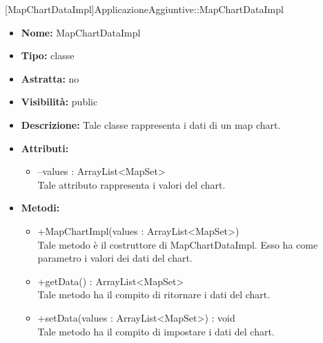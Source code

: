 			[MapChartDataImpl]{ApplicazioneAggiuntive::MapChartDataImpl}
			

	
			
			\begin{itemize}
			\item \textbf{Nome:} MapChartDataImpl
			\item \textbf{Tipo:} classe
			
		\item \textbf{Astratta:}
		no
			\item \textbf{Visibilità:} public
			\item \textbf{Descrizione:} Tale classe rappresenta i dati di un map chart.
			\item \textbf{Attributi:}
				\begin{itemize}
				\setlength{\itemsep}{5pt}
				
					\item[\ding{111}] {--values : ArrayList<MapSet>} \\ [1mm] Tale attributo rappresenta i valori del chart.
				\end{itemize}
		
			\item \textbf{Metodi:}
				\begin{itemize}
				\setlength{\itemsep}{5pt}
				
					\item[\ding{111}] {{+MapChartImpl(values : ArrayList<MapSet>)}} \\ [1mm] Tale metodo è il costruttore di MapChartDataImpl. Esso ha come parametro i valori dei dati del chart.
					\item[\ding{111}] {{+getData() : ArrayList<MapSet>}} \\ [1mm] Tale metodo ha il compito di ritornare i dati del chart.
					\item[\ding{111}] {{+setData(values : ArrayList<MapSet>) : void}} \\ [1mm] Tale metodo ha il compito di impostare i dati del chart.
				\end{itemize}
		
			\end{itemize}
	
